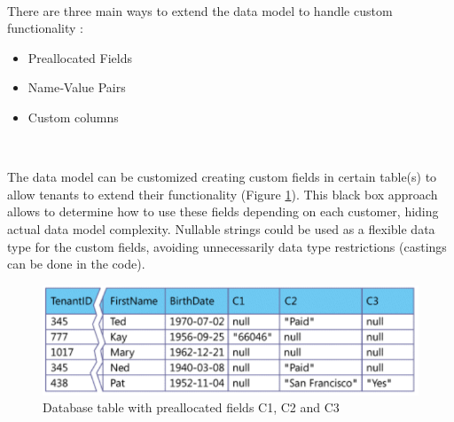 \documentclass[11pt,english]{article} %
\begin{document}
\

There are three main ways to extend the data model to handle custom functionality \cite{multi-tenant-data-architecture}:
\begin{itemize}
    \item Preallocated Fields
    \item Name‐Value Pairs
    \item Custom columns
\end{itemize}

\

The data model can be customized creating custom fields in certain table(s) to allow tenants to extend their functionality \cite{multi-tenant-data-architecture} (Figure \ref{fig:preallocated-database-fields}).
This black box approach allows to determine how to use these fields depending on each customer, hiding actual data model complexity.
Nullable strings could be used as a flexible data type for the custom fields, avoiding unnecessarily data type restrictions (castings can be done in the code).

\begin{figure}[H]
    \centering
    \includegraphics[scale=0.5]{img/preallocated-fields.png}
    \caption{Database table with preallocated fields C1, C2 and C3}
    \label{fig:preallocated-database-fields}
\end{figure}

\
\end{document}
